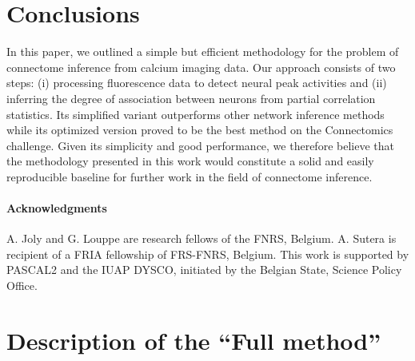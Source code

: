 \documentclass[wcp]{jmlr}
\begin{document}


\section{Conclusions} \label{sec:conclusion}

In this paper, we outlined a simple but efficient methodology for the problem
of connectome inference from calcium imaging data. Our approach consists of two
steps: (i) processing fluorescence data to detect neural peak activities and
(ii) inferring the degree of association between neurons from partial
correlation statistics. Its simplified variant outperforms other
network inference methods while its optimized version proved to be the best method
on the Connectomics challenge. Given its simplicity and good performance, we
therefore believe that the methodology presented in this work
would constitute a solid and easily reproducible baseline for further work in
the field of connectome inference.


\paragraph{Acknowledgments}
A. Joly and G. Louppe are research fellows of the FNRS, Belgium.  A. Sutera is
recipient of a FRIA fellowship of FRS-FNRS, Belgium. This work is supported by
PASCAL2 and the IUAP DYSCO, initiated by the Belgian State, Science Policy
Office.



\newpage
\clearpage




\newpage
\clearpage

\appendix


\section{Description  of the ``Full method''}
\label{app:optimized}
\end{document}
